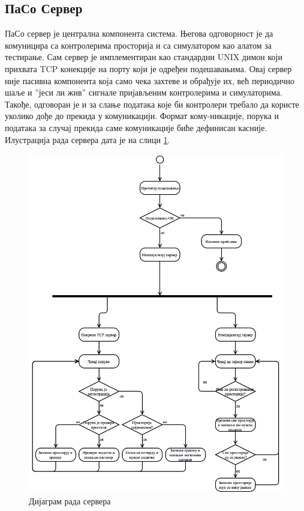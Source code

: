 \documentclass[a4paper, 12pt, diplomski]{etfcyr}
\begin{document}
			\subsection{ПаСо Сервер}
				\begin{justify}
					ПаСо сервер је централна компонента система. Његова одговорност је да комуницира са контролерима просторија и са симулатором као алатом за тестирање. Сам сервер је имплементиран као стандардни UNIX димон који прихвата TCP конекције на порту који је одређен подешавањима. Овај сервер није пасивна компонента која само чека захтеве и обрађује их, већ периодично шаље и ”јеси ли жив” сигнале пријављеним контролерима и симулаторима. Такође, одговоран је и за слање података које би контролери требало да користе уколико дође до прекида у комуникацији. Формат кому-никације, порука и података за случај прекида саме комуникације биће дефинисан касније.
					Илустрација рада сервера дата је на слици \ref{figure:3}.
					\begin{figure}[h]
						\begin{center}
							\includegraphics[scale=0.35]{ServerWorkflow.png}
						\end{center}
						\caption{Дијаграм рада сервера}
						\label{figure:3}
					\end{figure}
				\end{justify}
\end{document}
